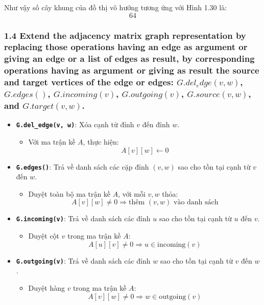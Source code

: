 \documentclass{article}
\begin{document}
	\vspace{1em}
	Như vậy số cây khung của đồ thị vô hướng tương ứng với Hình 1.30 là:
	\[
	\boxed{64}
	\]
	
	\subsubsection*{1.4 Extend the adjacency matrix graph representation by replacing those operations having an edge as argument or giving an edge or a list of edges as result, by corresponding operations having as argument or giving as result the source and target vertices of the edge or edges: $G.del_edge(v,w)$, $G.edges()$, $G.incoming(v)$, $G.outgoing(v)$, $G.source(v,w)$, and $G.target(v,w)$.}
	
	\begin{itemize}
		\item \textbf{\texttt{G.del\_edge(v, w)}}: Xóa cạnh từ đỉnh $v$ đến đỉnh $w$.
		
		\begin{itemize}
			\item Với ma trận kề $A$, thực hiện: 
			\[
			A[v][w] \gets 0
			\]
		\end{itemize}
		
		\item \textbf{\texttt{G.edges()}}: Trả về danh sách các cặp đỉnh $(v, w)$ sao cho tồn tại cạnh từ $v$ đến $w$.
		
		\begin{itemize}
			\item Duyệt toàn bộ ma trận kề $A$, với mỗi $v,w$ thỏa:
			\[
			A[v][w] \ne 0 \Rightarrow \text{thêm } (v, w) \text{ vào danh sách}
			\]
		\end{itemize}
		
		\item \textbf{\texttt{G.incoming(v)}}: Trả về danh sách các đỉnh $u$ sao cho tồn tại cạnh từ $u$ đến $v$.
		
		\begin{itemize}
			\item Duyệt cột $v$ trong ma trận kề $A$:
			\[
			A[u][v] \ne 0 \Rightarrow u \in \text{incoming}(v)
			\]
		\end{itemize}
		
		\item \textbf{\texttt{G.outgoing(v)}}: Trả về danh sách các đỉnh $w$ sao cho tồn tại cạnh từ $v$ đến $w$.
		
		\begin{itemize}
			\item Duyệt hàng $v$ trong ma trận kề $A$:
			\[
			A[v][w] \ne 0 \Rightarrow w \in \text{outgoing}(v)
			\]
		\end{itemize}
		

\end{itemize}
\end{document}
